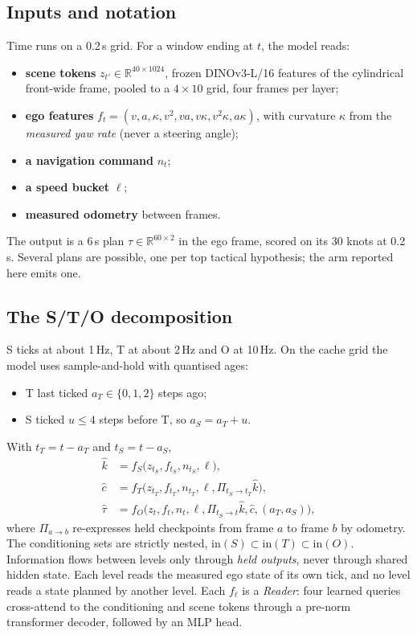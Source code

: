 \documentclass[10pt,twocolumn]{article}
\theoremstyle{remark}
\newcommand{\Rset}{\mathbb{R}}
\begin{document}
\subsection{Inputs and notation}
Time runs on a 0.2\,s grid. For a window ending at $t$, the model reads:
\begin{itemize}
  \item \textbf{scene tokens} $z_{t'}\in\Rset^{40\times1024}$, frozen DINOv3-L/16 features of the cylindrical front-wide frame, pooled to a
        $4\times10$ grid, four frames per layer;
  \item \textbf{ego features} $f_t=(v,a,\kappa,v^2,va,v\kappa,v^2\kappa,a\kappa)$, with curvature $\kappa$ from the \emph{measured yaw rate}
        (never a steering angle);
  \item \textbf{a navigation command} $n_t$;
  \item \textbf{a speed bucket} $\ell$;
  \item \textbf{measured odometry} between frames.
\end{itemize}
The output is a 6\,s plan $\tau\in\Rset^{60\times2}$ in the ego frame, scored on its 30 knots at 0.2\,s. Several plans are possible,
one per top tactical hypothesis; the arm reported here emits one.

\subsection{The S/T/O decomposition}
S ticks at about 1\,Hz, T at about 2\,Hz and O at 10\,Hz. On the cache grid the model uses sample-and-hold with quantised ages:
\begin{itemize}
  \item T last ticked $a_T\in\{0,1,2\}$ steps ago;
  \item S ticked $u\le4$ steps before T, so $a_S=a_T+u$.
\end{itemize}
With $t_T=t-a_T$ and $t_S=t-a_S$,
\begin{equation}
\begin{aligned}
\hat k&=f_S\big(z_{t_S},f_{t_S},n_{t_S},\ell\big),\\
\hat c&=f_T\big(z_{t_T},f_{t_T},n_{t_T},\ell,\Pi_{t_S\to t_T}\hat k\big),\\
\hat\tau&=f_O\big(z_t,f_t,n_t,\ell,\Pi_{t_S\to t}\hat k,\hat c,(a_T,a_S)\big),
\end{aligned}
\end{equation}
where $\Pi_{a\to b}$ re-expresses held checkpoints from frame $a$ to frame $b$ by odometry. The conditioning sets are strictly nested,
$\mathrm{in}(S)\subset\mathrm{in}(T)\subset\mathrm{in}(O)$. Information flows between levels only through \emph{held outputs}, never
through shared hidden state. Each level reads the measured ego state of its own tick, and no level reads a state planned by another
level. Each $f_\ell$ is a \emph{Reader}: four learned queries cross-attend to the conditioning and scene tokens
through a pre-norm transformer decoder, followed by an MLP head.
\end{document}
